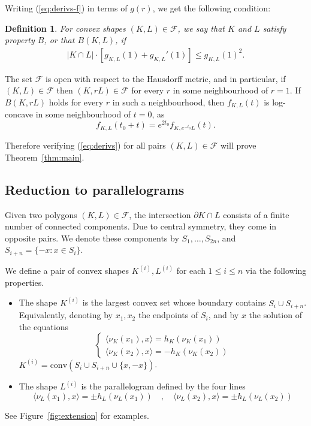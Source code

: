 \documentclass[a4paper,10pt,twoside,reqno,intlimits]{amsart}
\newtheorem*{definition}{Definition}
\begin{document}
Writing (\ref{eq:derivs-f}) in terms of $g(r)$, we get the following condition:

\begin{definition}
For convex shapes $(K, L) \in {\mathcal{F}}$, we say that $K$ and $L$ satisfy property $B$, or that $B(K, L)$, if
\begin{align}
|K \cap L| \cdot [g_{K,L}(1) + g_{K,L}'(1)] \le g_{K,L}(1)^2 . \label{eq:derivs}
\end{align}
\end{definition}

The set ${\mathcal{F}}$ is open with respect to the Hausdorff metric, and in particular,
if $(K, L) \in {\mathcal{F}}$ then $(K, r L) \in {\mathcal{F}}$ for every $r$ in some neighbourhood of $r = 1$.
If $B(K, r L)$ holds for every $r$ in such a neighbourhood, then $f_{K, L}(t)$ is log-concave in
some neighbourhood of $t = 0$, as
$$ f_{K, L}(t_0 + t) = e^{2 t_0} f_{K, e^{-t_0} L}(t) . $$

Therefore verifying (\ref{eq:derivs}) for all pairs $(K,L) \in {\mathcal{F}}$ will prove Theorem~\ref{thm:main}.

\subsection*{Reduction to parallelograms}
Given two polygons $(K,L) \in {\mathcal{F}}$,
the intersection ${\partial K} \cap L$ consists of a finite number of connected components.
Due to central symmetry, they come in opposite pairs.
We denote these components by $S_1, \ldots, S_{2n}$, and ${S_{i+n} = \{ -x : x \in S_i \}}$.

We define a pair of convex shapes $K^{(i)}, L^{(i)}$ for each $1 \le i \le n$ via the following properties.
\begin{itemize}
\item
The shape $K^{(i)}$ is the largest convex set whose boundary contains $S_i \cup S_{i+n}$.
Equivalently, denoting by $x_1,x_2$ the endpoints of $S_i$, and by $x$ the solution of the equations
$$ \begin{cases}
  \langle \nu_K(x_1), x \rangle = h_K(\nu_K(x_1)) \\
  \langle \nu_K(x_2), x \rangle = -h_K(\nu_K(x_2))
\end{cases} $$
$K^{(i)} = {\text{conv}} \left( S_i \cup S_{i+n} \cup \{x, -x\} \right)$.

\item
The shape $L^{(i)}$ is the parallelogram defined by the four lines
$$ \langle \nu_L(x_1), x \rangle = \pm h_L(\nu_L(x_1)) \quad , \quad \langle \nu_L(x_2), x \rangle = \pm h_L(\nu_L(x_2)) $$
\end{itemize}
See Figure~\ref{fig:extension} for examples.
\end{document}
